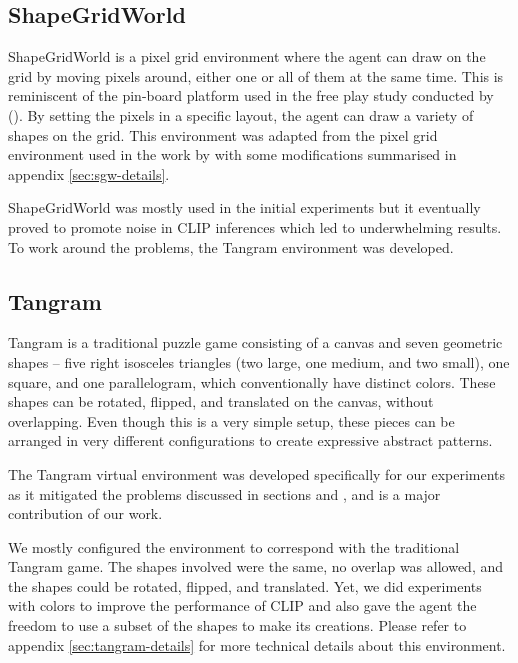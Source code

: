 \subsection{ShapeGridWorld}
\label{sec:sgw}
ShapeGridWorld is a pixel grid environment where the agent can draw on the grid by moving pixels around, either one or all of them at the same time.
This is reminiscent of the pin-board platform used in the free play study conducted by \citet{diggs} ().
By setting the pixels in a specific layout, the agent can draw a variety of shapes on the grid.
This environment was adapted from the pixel grid environment used in the work by \citet{rair} with some modifications summarised in appendix \ref{sec:sgw-details}.

ShapeGridWorld was mostly used in the initial experiments but it eventually proved to promote noise in CLIP inferences which led to underwhelming results.
To work around the problems, the Tangram environment was developed.

\subsection{Tangram}
\label{sec:tangram}
Tangram is a traditional puzzle game consisting of a canvas and seven geometric shapes -- five right isosceles triangles (two large, one medium, and two small), one square, and one parallelogram, which conventionally have distinct colors.
These shapes can be rotated, flipped, and translated on the canvas, without overlapping.
Even though this is a very simple setup, these pieces can be arranged in very different configurations to create expressive abstract patterns.

The Tangram virtual environment was developed specifically for our experiments as it mitigated the problems discussed in sections  and , and is a major contribution of our work.

We mostly configured the environment to correspond with the traditional Tangram game.
The shapes involved were the same, no overlap was allowed, and the shapes could be rotated, flipped, and translated.
Yet, we did experiments with colors to improve the performance of CLIP and also gave the agent the freedom to use a subset of the shapes to make its creations.
Please refer to appendix \ref{sec:tangram-details} for more technical details about this environment.
